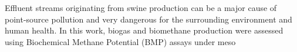 Effluent streams originating from swine production can be a major cause of point-source pollution and very dangerous for the surrounding environment and human health. In this work, biogas and biomethane production were assessed using Biochemical Methane Potential (BMP) assays under meso